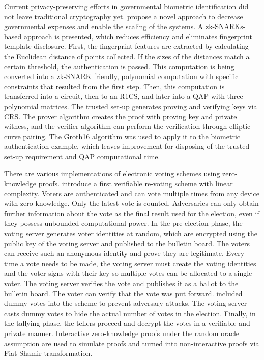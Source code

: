 Current privacy-preserving efforts in governmental biometric identification did not leave traditional cryptography yet. \citet{Guo} propose a novel approach to decrease governmental expenses and enable the scaling of the systems. A zk-SNARKs-based approach is presented, which reduces efficiency and eliminates fingerprint template disclosure. First, the fingerprint features are extracted by calculating the Euclidean distance of points collected. If the sizes of the distances match a certain threshold, the authentication is passed. This computation is being converted into a zk-SNARK friendly, polynomial computation with specific constraints that resulted from the first step. Then, this computation is transferred into a circuit, then to an R1CS, and later into a QAP with three polynomial matrices. The trusted set-up generates proving and verifying keys via CRS. The prover algorithm creates the proof with proving key and private witness, and the verifier algorithm can perform the verification through elliptic curve pairing. The Groth16 algorithm was used to apply it to the biometric authentication example, which leaves improvement for disposing of the trusted set-up requirement and QAP computational time.

There are various implementations of electronic voting schemes using zero-knowledge proofs. \citet{Querejeta} introduce a first verifiable re-voting scheme with linear complexity. Voters are authenticated and can vote multiple times from any device with zero knowledge. Only the latest vote is counted. Adversaries can only obtain further information about the vote as the final result used for the election, even if they possess unbounded computational power. In the pre-election phase, the voting server generates voter identities at random, which are encrypted using the public key of the voting server and published to the bulletin board. The voters can receive such an anonymous identity and prove they are legitimate. Every time a vote needs to be made, the voting server must create the voting identities and the voter signs with their key so multiple votes can be allocated to a single voter. The voting server verifies the vote and publishes it as a ballot to the bulletin board. The voter can verify that the vote was put forward. \citet{Querejeta} included dummy votes into the scheme to prevent adversary attacks. The voting server casts dummy votes to hide the actual number of votes in the election. Finally, in the tallying phase, the tellers proceed and decrypt the votes in a verifiable and private manner. Interactive zero-knowledge proofs under the random oracle assumption are used to simulate proofs and turned into non-interactive proofs via Fiat-Shamir transformation.

